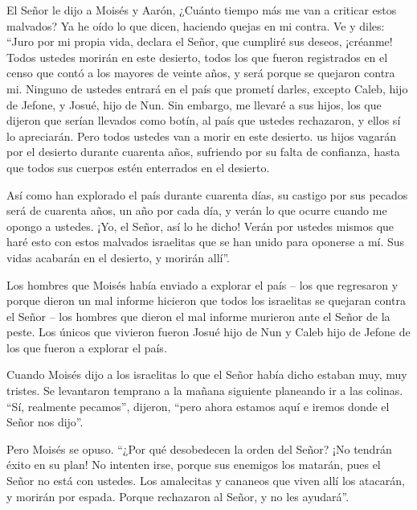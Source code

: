  El Señor le dijo a Moisés y Aarón,  ¿Cuánto
tiempo más me van a criticar estos malvados? Ya he oído lo que dicen,
haciendo quejas en mi contra.  Ve y diles: ``Juro por mi
propia vida, declara el Señor, que cumpliré sus deseos, ¡créanme!
 Todos ustedes morirán en este desierto, todos los que
fueron registrados en el censo que contó a los mayores de veinte años, y
será porque se quejaron contra mi.  Ninguno de ustedes
entrará en el país que prometí darles, excepto Caleb, hijo de Jefone, y
Josué, hijo de Nun.  Sin embargo, me llevaré a sus hijos,
los que dijeron que serían llevados como botín, al país que ustedes
rechazaron, y ellos sí lo apreciarán.  Pero todos ustedes
van a morir en este desierto.  us hijos vagarán por el
desierto durante cuarenta años, sufriendo por su falta de confianza,
hasta que todos sus cuerpos estén enterrados en el desierto.

 Así como han explorado el país durante cuarenta días, su
castigo por sus pecados será de cuarenta años, un año por cada día, y
verán lo que ocurre cuando me opongo a ustedes.  ¡Yo, el
Señor, así lo he dicho! Verán por ustedes mismos que haré esto con estos
malvados israelitas que se han unido para oponerse a mí. Sus vidas
acabarán en el desierto, y morirán allí''.

 Los hombres que Moisés había enviado a explorar el país --
los que regresaron y porque dieron un mal informe hicieron que todos los
israelitas se quejaran contra el Señor --  los hombres que
dieron el mal informe murieron ante el Señor de la peste. 
Los únicos que vivieron fueron Josué hijo de Nun y Caleb hijo de Jefone
de los que fueron a explorar el país.

 Cuando Moisés dijo a los israelitas lo que el Señor había
dicho estaban muy, muy tristes.  Se levantaron temprano a
la mañana siguiente planeando ir a las colinas. ``Sí, realmente
pecamos'', dijeron, ``pero ahora estamos aquí e iremos donde el Señor
nos dijo''.

 Pero Moisés se opuso. ``¿Por qué desobedecen la orden del
Señor? ¡No tendrán éxito en su plan!  No intenten irse,
porque sus enemigos los matarán, pues el Señor no está con ustedes.
 Los amalecitas y cananeos que viven allí los atacarán, y
morirán por espada. Porque rechazaron al Señor, y no les ayudará''.

